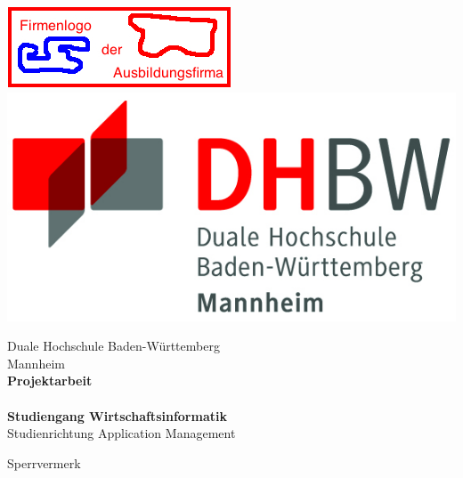 \begin{titlepage}
\begin{minipage}{\textwidth}
		\vspace{-2cm}
		\noindent \includegraphics[scale=0.71]{img/firmenlogo.jpg} \hfill   \includegraphics{img/logo.jpg}
\end{minipage}
\vspace{1em}
\sffamily
\begin{center}
	\textsf{\large{}Duale Hochschule Baden-W\"urttemberg\\[1.5mm] Mannheim}\\[2em]
	\textsf{\textbf{\Large{}Projektarbeit}}\\[3mm]
	\textsf{\textbf{\DerTitelDerArbeit}} \\[1.5cm]
	\textsf{\textbf{\Large{}Studiengang Wirtschaftsinformatik}\\[3mm] \textsf{Studienrichtung Application Management}}
	
	\vspace{3em}
	\textsf{\Large{Sperrvermerk}}
\vfill

\begin{minipage}{\textwidth}


\end{minipage}
\end{center}
\end{titlepage}
